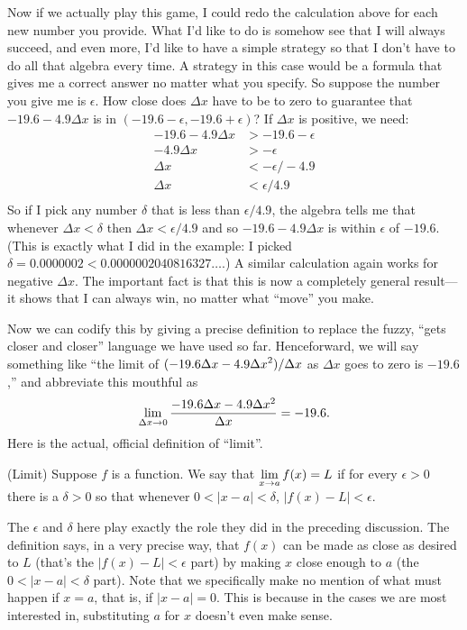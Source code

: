 Now if we actually play this game, I could redo the calculation above
for each new number you provide. What I'd like to do is somehow see
that I will always succeed, and even more, I'd like to have a simple
strategy so that I don't have to do all that algebra every time.
A strategy in this case would be a formula that gives me a correct
answer no matter what you specify. So suppose the number you give me
is $\epsilon$. How close does $\Delta x$ have to be to zero to
guarantee that $-19.6-4.9\Delta x$ is in $(-19.6-\epsilon,
-19.6+\epsilon)$? If $\Delta x$ is positive, we need:
\begin{align*}
-19.6-4.9\Delta x&> -19.6-\epsilon \\
-4.9\Delta x&>-\epsilon \\
\Delta x&<-\epsilon/-4.9 \\
\Delta x&<\epsilon/4.9 \\
\end{align*}
So if I pick any number $\delta$ that is less than $\epsilon/4.9$, the
algebra tells me that whenever $\Delta x<\delta$ then 
$\Delta x<\epsilon/4.9$ and so $-19.6-4.9\Delta x$ is within
$\epsilon$ of $-19.6$. (This is exactly what I did in the example:
I picked $\delta = 0.0000002 < 0.0000002040816327\ldots$.)
A similar calculation again works for negative
$\Delta x$.
The important fact is that this is now a completely general result---it
shows that I can always win, no matter what ``move'' you make.

Now we can codify this by giving a precise definition to replace the
fuzzy, ``gets closer and closer'' language we have used so
far. Henceforward, we will say something like ``the limit of
$\displaystyle (-19.6\Delta x-4.9\Delta x^2)/\Delta x$ as $\Delta x$ goes to zero is
$-19.6$,'' and abbreviate this mouthful as
$$\lim_{\Delta x\to 0} {-19.6\Delta x-4.9\Delta x^2\over \Delta x}
= -19.6.
$$
Here is the actual, official definition of ``limit''.

\begin{definition} (Limit) Suppose $f$ is a function. We say that $\displaystyle \lim_{x\to
  a}f(x)=L$ if for every $\epsilon>0$ there is a $\delta > 0$ so that
  whenever $0 < |x-a| < \delta$, $|f(x)-L|<\epsilon$.
\end{definition}
\label{def:limit}

The $\epsilon$ and $\delta$ here play exactly the role they did in the
preceding discussion. The definition says, in a very precise way, that
$f(x)$ can be made as close as desired to $L$ (that's the 
$|f(x)-L|<\epsilon$ part) by making $x$ close enough to $a$ (the 
$0 < |x-a| < \delta$ part). Note that we specifically make no mention
of what must happen if $x=a$, that is, if $|x-a|=0$. This is because
in the cases we are most interested in, substituting $a$ for $x$
doesn't even make sense.

